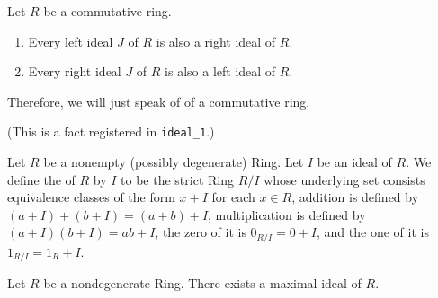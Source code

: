 \begin{theorem}
Let $R$ be a commutative ring.
\begin{enumerate}
\item Every left ideal $J$ of $R$ is also a right ideal of $R$.
\item Every right ideal $J$ of $R$ is also a left ideal of $R$.
\end{enumerate}
Therefore, we will just speak of  of a commutative ring.
\end{theorem}
(This is a fact registered in \texttt{ideal\_1}.)

\begin{definition}
Let $R$ be a nonempty (possibly degenerate) Ring.
Let $I$ be an ideal of $R$.
We define the  of $R$ by $I$ to be the strict
Ring $R/I$ whose underlying set consists equivalence classes of the form
$x + I$ for each $x\in R$, addition is defined by $(a+I)+(b+I)=(a+b)+I$,
multiplication is defined by $(a+I)(b+I)=ab+I$, the zero of it is $0_{R/I}=0+I$,
and the one of it is $1_{R/I}=1_{R}+I$.
\end{definition}

\begin{theorem}
Let $R$ be a nondegenerate Ring.
There exists a maximal ideal of $R$.
\end{theorem}